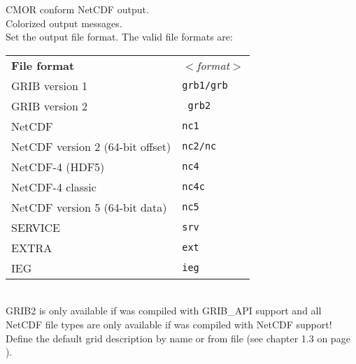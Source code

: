 \begin{tabbing}
         \> CMOR conform NetCDF output. \\
         \> Colorized output messages. \\
         \> Set the output file format. The valid file formats are: \\
         \> \parbox[r]{3in}{
              \vspace*{1mm}
              \hspace*{0cm}\begin{tabular}{|l|l|}
              \hline
              \rowcolor{pcolor2}
              \textbf{File format}          & \textsl{$<$format$>$}\\
               GRIB version 1            & \texttt{grb1/grb}  \\
               GRIB version 2            & \texttt{ grb2} \\
               NetCDF                    & \texttt{nc1}   \\
               NetCDF version 2 (64-bit offset) & \texttt{nc2/nc}  \\
               NetCDF-4 (HDF5)           & \texttt{nc4}  \\
               NetCDF-4 classic          & \texttt{nc4c} \\
               NetCDF version 5 (64-bit data) & \texttt{nc5}  \\
               SERVICE                   & \texttt{srv}  \\
               EXTRA                     & \texttt{ext}  \\
               IEG                       & \texttt{ieg}  \\
              \hline
              \end{tabular}
              \vspace*{1mm}
            } \\
         \> GRIB2 is only available if {\CDO} was compiled with GRIB\_API support and all \\
         \> NetCDF file types are only available if {\CDO} was compiled with NetCDF support! \\
         \> Define the default grid description by name or from file (see chapter 1.3 on page \pageref{GRID_DESCRIPTION}). \\

\end{tabbing}
